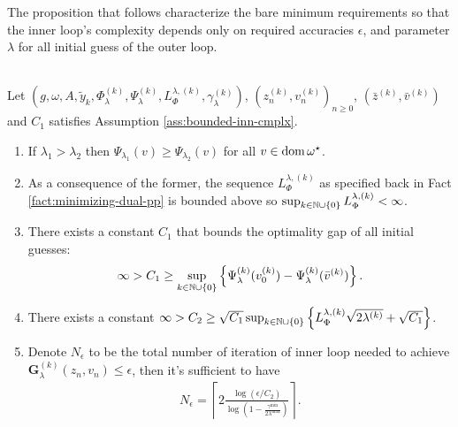 \documentclass[12pt]{article}
\begin{document}
        \par
        The proposition that follows characterize the bare minimum requirements so that the inner loop's complexity depends only on required accuracies $\epsilon$, and parameter $\lambda$ for all initial guess of the outer loop. 
        \begin{proposition}\;\label{prop:inner-lp-cmplx}\\
            Let $\left(g, \omega, A, \tilde y_k, \Phi_\lambda^{(k)}, \Psi_\lambda^{(k)}, L^{\lambda, (k)}_{\Phi} ,\gamma_\lambda^{(k)}\right)$, $\left(z_n^{(k)}, v_{n}^{(k)}\right)_{n \ge 0}$, $\left(\bar z^{(k)}, \bar v^{(k)}\right)$ and $C_1$ satisfies Assumption \ref{ass:bounded-inn-cmplx}. 
            \begin{enumerate}[nosep]
                \item\label{prop:inner-lp-cmplx-result1} 
                If $\lambda_1 > \lambda_2$ then $\Psi_{\lambda_1}(v) \ge \Psi_{\lambda_2}(v)$ for all $v \in \operatorname{dom} \omega^\star$. 
                \item\label{prop:inner-lp-cmplx-result2}  As a consequence of the former, the sequence $L_\Phi^{\lambda, (k)}$ as specified back in Fact \ref{fact:minimizing-dual-pp} is bounded above so $\sup_{k \in \mathbb N \cup \{0\}}L_\Phi^{\lambda, (k)} < \infty$. 
                \item There exists a constant $C_1$ that bounds the optimality gap of all initial guesses: 
                \begin{align*}
                    \infty > C_1 \ge  \sup_{k \in \mathbb N \cup \{0\}}\left\lbrace
                        \Psi_{\lambda}^{(k)}(v^{(k)}_0) - \Psi_\lambda^{(k)}(\bar v^{(k)})
                    \right\rbrace. 
                \end{align*}
                \item\label{prop:inner-lp-cmplx-result3} 
                There exists a constant $\infty > C_2 \ge \sqrt{C_1}\sup_{k \in \mathbb N \cup \{0\}}\left\lbrace L_\Phi^{\lambda, (k)}\sqrt{2\lambda^{(k)}} + \sqrt{C_1}\right\rbrace$. 
                \item\label{prop:inner-lp-cmplx-result4} 
                Denote $N_\epsilon$ to be the total number of iteration of inner loop needed to achieve $\mathbf G_\lambda^{(k)}(z_n, v_n) \le \epsilon$, then it's sufficient to have 
                \begin{align*}
                    N_{\epsilon} = \left\lceil 
                        2\frac{\log(\epsilon/C_2)}{
                            \log\left(
                                1 - \frac{\gamma^{\min}}{2\lambda^{\max}}
                            \right)
                        }
                    \right\rceil. 
                \end{align*}
            \end{enumerate}
        \end{proposition}
\end{document}
